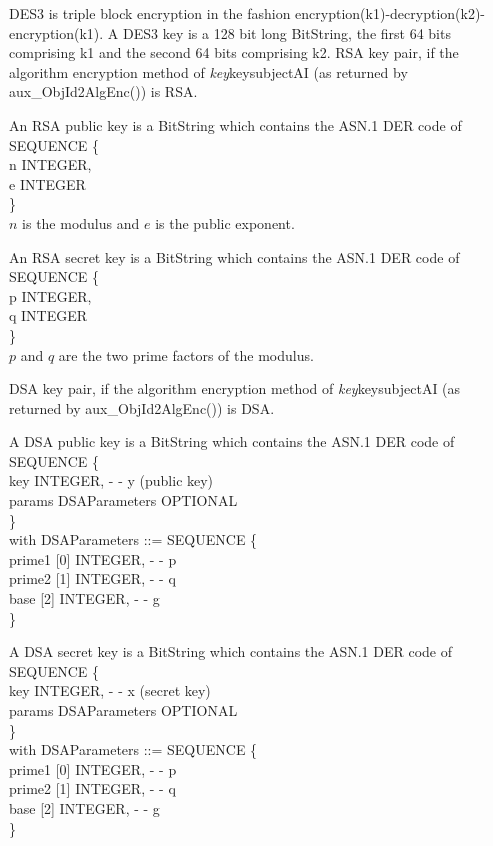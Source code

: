     DES3 is triple block encryption in the fashion encryption(k1)-decryption(k2)-encryption(k1).
    A DES3 key is a 128 bit long BitString, the first 64 bits comprising k1 and the
    second 64 bits comprising k2.
\m  RSA key pair, 
    if the algorithm encryption method 
    of {\em key}\pf key\pf subjectAI (as returned by aux\_ObjId2AlgEnc()) is RSA. 

    An RSA public key is a BitString
    which contains the ASN.1 DER code of
    \bvtab
    \4  SEQUENCE \{ \\
    \4  \2       n INTEGER,   \\
    \4  \2       e INTEGER  \\
    \4  \} \\
    \evtab
    $n$ is the modulus and $e$ is the public exponent.
    

    An RSA secret key is a BitString
    which contains the ASN.1 DER code of
    \bvtab
    \4  SEQUENCE \{ \\
    \4  \2       p INTEGER,   \\
    \4  \2       q INTEGER  \\
    \4  \} \\
    \evtab
    $p$ and $q$ are the two prime factors of the modulus.

\m  DSA key pair, 
    if the algorithm encryption method 
    of {\em key}\pf key\pf subjectAI (as returned by aux\_ObjId2AlgEnc()) is DSA. 

    A DSA public key is a BitString
    which contains the ASN.1 DER code of
    \bvtab
    \4  SEQUENCE \{ \\
    \4  \2       key INTEGER, - - y (public key)   \\
    \4  \2       params DSAParameters OPTIONAL  \\
    \4  \} \\
    \evtab
    with
    \bvtab
    DSAParameters ::= SEQUENCE \{ \\
    \4  \2       prime1 [0] INTEGER, - - p \\
    \4  \2       prime2 [1] INTEGER, - - q \\
    \4  \2       base [2] INTEGER, - - g \\
    \4  \} \\
    \evtab
    
    A DSA secret key is a BitString
    which contains the ASN.1 DER code of
    \bvtab
    \4  SEQUENCE \{ \\
    \4  \2       key INTEGER, - - x (secret key)   \\
    \4  \2       params DSAParameters OPTIONAL  \\
    \4  \} \\
    \evtab
    with
    \bvtab
    DSAParameters ::= SEQUENCE \{ \\
    \4  \2       prime1 [0] INTEGER, - - p \\
    \4  \2       prime2 [1] INTEGER, - - q \\
    \4  \2       base [2] INTEGER, - - g \\
    \4  \} \\
    \evtab

